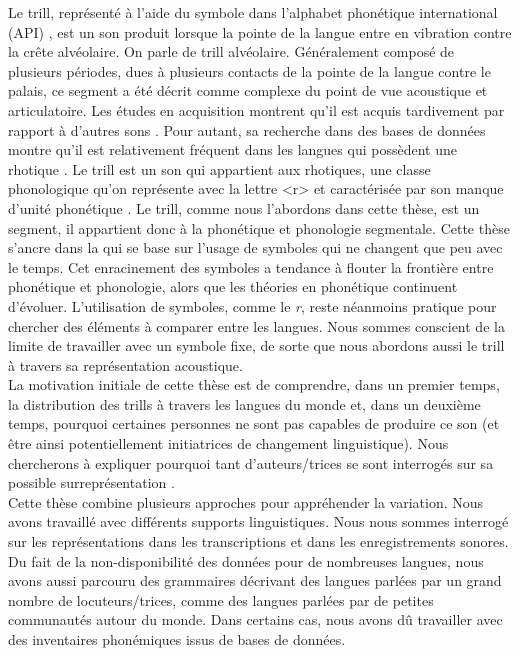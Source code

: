 Le trill, représenté à l'aide du symbole  dans l'alphabet phonétique international (API) \parencite{barryAnotherRtickle1997,whitleyRhoticRepresentationProblems2003,wieseRepresentationRhoticsRepresentation2011}, est un son produit lorsque la pointe de la langue entre en vibration contre la crête alvéolaire. On parle de trill alvéolaire. Généralement composé de plusieurs périodes, dues à plusieurs contacts de la pointe de la langue contre le palais, ce segment a été décrit comme complexe du point de vue acoustique et articulatoire. Les études en acquisition montrent qu'il est acquis tardivement par rapport à d'autres sons \parencite{mcleodChildrenConsonantAcquisition2018}. Pour autant, sa recherche dans des bases de données montre qu'il est relativement fréquent dans les langues qui possèdent une rhotique \parencite{maddiesonPatternsSounds1984}. Le trill est un son qui appartient aux rhotiques, une classe phonologique qu'on représente avec la lettre <r> et caractérisée par son manque d'unité phonétique \parencite{lindauStory1985,scobbieVariable2006,magnusonStoryTwoVocal2007,chabotWhatWrongBeing2019}.
Le trill, comme nous l'abordons dans cette thèse, est un segment, il appartient donc à la phonétique et phonologie segmentale. Cette thèse s'ancre dans la  \parencite{ohalaRelationPhoneticsPhonology2010} qui se base sur l'usage de symboles qui ne changent que peu avec le temps. Cet enracinement des symboles a tendance à flouter la frontière entre phonétique et phonologie, alors que les théories en phonétique continuent d'évoluer. L'utilisation de symboles, comme le \textit{r}, reste néanmoins pratique pour chercher des éléments à comparer entre les langues. Nous sommes conscient de la limite de travailler avec un symbole fixe, de sorte que nous abordons aussi le trill à travers sa représentation acoustique.\\


La motivation initiale de cette thèse est de comprendre, dans un premier temps, la distribution des trills à travers les langues du monde et, dans un deuxième temps, pourquoi certaines personnes ne sont pas capables de produire ce son (et être ainsi potentiellement initiatrices de changement linguistique).  Nous chercherons à expliquer pourquoi tant d'auteurs/trices se sont interrogés sur sa possible surreprésentation \parencite{maddiesonPatternsSounds1984,lindauStory1985}.\\


Cette thèse combine plusieurs approches pour appréhender la variation. Nous avons travaillé avec différents supports linguistiques. Nous nous sommes interrogé sur les représentations dans les transcriptions et dans les enregistrements sonores. Du fait de la non-disponibilité des données pour de nombreuses langues, nous avons aussi parcouru des grammaires décrivant des langues parlées par un grand nombre de locuteurs/trices, comme des langues parlées par de petites communautés autour du monde. Dans certains cas, nous avons dû travailler avec des inventaires phonémiques issus de bases de données.\\

